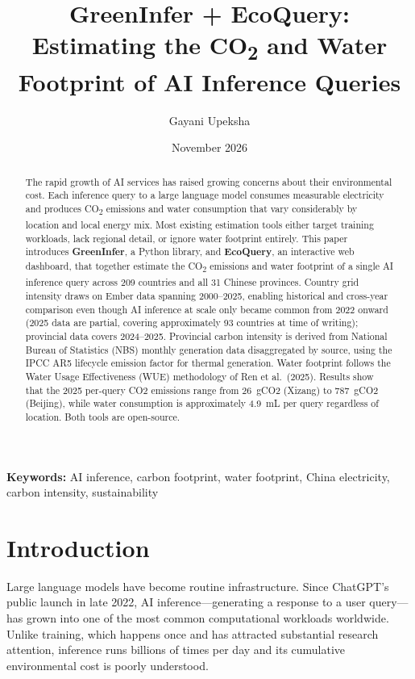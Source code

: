 \documentclass[11pt,a4paper]{article}
\title{\textbf{GreenInfer + EcoQuery: Estimating the CO\textsubscript{2} and Water
       Footprint of AI Inference Queries}}
\author{Gayani Upeksha}
\date{November 2026}
\begin{document}
\maketitle
\thispagestyle{empty}

\begin{abstract}
The rapid growth of AI services has raised growing concerns about their
environmental cost. Each inference query to a large language model consumes
measurable electricity and produces CO\textsubscript{2} emissions and water
consumption that vary considerably by location and local energy mix. Most
existing estimation tools either target training workloads, lack regional
detail, or ignore water footprint entirely. This paper introduces
\textbf{GreenInfer}, a Python library, and \textbf{EcoQuery}, an interactive
web dashboard, that together estimate the CO\textsubscript{2} emissions and
water footprint of a single AI inference query across 209 countries and
all 31 Chinese provinces. Country grid intensity draws on Ember data
spanning 2000--2025, enabling historical and cross-year comparison even
though AI inference at scale only became common from 2022 onward
(2025 data are partial, covering approximately 93 countries at time of writing);
provincial data covers 2024--2025. Provincial carbon
intensity is derived from National Bureau of Statistics (NBS) monthly
generation data disaggregated by source, using the IPCC AR5 lifecycle
emission factor for thermal generation. Water footprint follows the
Water Usage Effectiveness (WUE) methodology of Ren et al.\ (2025). Results show that the 2025 per-query CO2 emissions range from
26~gCO2 (Xizang) to 787~gCO2 (Beijing), while water consumption
is approximately 4.9~mL per query regardless of location. Both tools are open-source.
\end{abstract}

\vspace{1em}
\noindent\textbf{Keywords:} AI inference, carbon footprint, water footprint,
China electricity, carbon intensity, sustainability

\section{Introduction}

Large language models have become routine infrastructure. Since ChatGPT's
public launch in late 2022, AI inference---generating a response to a user
query---has grown into one of the most common computational workloads
worldwide. Unlike training, which happens once and has attracted substantial
research attention, inference runs billions of times per day and its
cumulative environmental cost is poorly understood.
\end{document}
